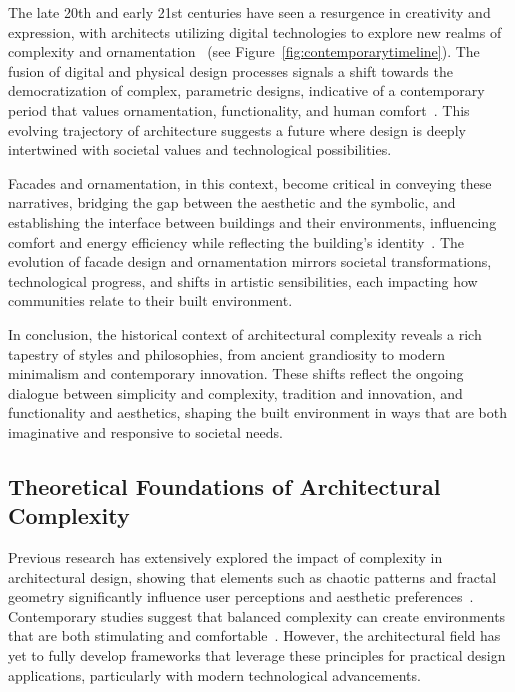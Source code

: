 The late 20th and early 21st centuries have seen a resurgence in creativity and expression, with architects utilizing digital technologies to explore new realms of complexity and ornamentation~\cite{Burlando2019} (see Figure~\ref{fig:contemporarytimeline}).
The fusion of digital and physical design processes signals a shift towards the democratization of complex, parametric designs, indicative of a contemporary period that values ornamentation, functionality, and human comfort~\cite{Kim2019}.
This evolving trajectory of architecture suggests a future where design is deeply intertwined with societal values and technological possibilities.

Facades and ornamentation, in this context, become critical in conveying these narratives, bridging the gap between the aesthetic and the symbolic, and establishing the interface between buildings and their environments, influencing comfort and energy efficiency while reflecting the building's identity~\cite{Kamal2020}.
The evolution of facade design and ornamentation mirrors societal transformations, technological progress, and shifts in artistic sensibilities, each impacting how communities relate to their built environment.

In conclusion, the historical context of architectural complexity reveals a rich tapestry of styles and philosophies, from ancient grandiosity to modern minimalism and contemporary innovation.
These shifts reflect the ongoing dialogue between simplicity and complexity, tradition and innovation, and functionality and aesthetics, shaping the built environment in ways that are both imaginative and responsive to societal needs.


\subsection{Theoretical Foundations of Architectural Complexity}
\label{subsec:ComplexityStudies}

Previous research has extensively explored the impact of complexity in architectural design, showing that elements such as chaotic patterns and fractal geometry significantly influence user perceptions and aesthetic preferences~\cite{Bies2016}.
Contemporary studies suggest that balanced complexity can create environments that are both stimulating and comfortable~\cite{Redies2015}.
However, the architectural field has yet to fully develop frameworks that leverage these principles for practical design applications, particularly with modern technological advancements.

